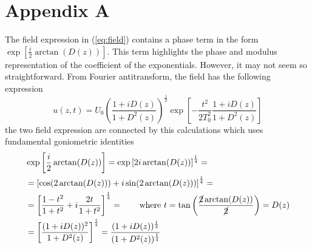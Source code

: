 \documentclass[10pt, lettersize, journal, onecolumn]{IEEEtran}
\begin{document}
\section*{Appendix A}
The field expression in (\ref{eq:field}) contains a phase term in the form $\exp\left[\frac{i}{2} \arctan(D(z)) \right]$. This term highlights the phase and modulus representation of the coefficient of the exponentials.
However, it may not seem so straightforward. From Fourier antitransform, the field has the following expression
\begin{equation}
	u(z, t) = U_0 \left(\dfrac{1+iD(z)}{1+D^2(z)}\right)^{\frac{1}{2}} \exp\left[-\dfrac{t^2}{2T_0^2} \dfrac{1+iD(z)}{1+D^2(z)}\right]
\end{equation}
the two field expression are connected by this calculations which uses fundamental goniometric identities
\begin{align}
	&  \exp\left[ \dfrac{i}{2} \arctan(D(z))\right] = \exp\left[ 2i \arctan(D(z))\right]^{\frac{1}{4}}=\\
	&  =\left[\cos(2\arctan(D(z))) + i \sin(2\arctan(D(z)))\right]^{\frac{1}{4}}=	\\
	&  =\left[\dfrac{1-t^2}{1+t^2} + i \dfrac{2t}{1+t^2}\right]^{\frac{1}{4}}  =  \qquad \text{where $t=\tan\left(\dfrac{\cancel{2}\arctan(D(z))}{\cancel{2}}\right) = D(z)$} \\
	& = \left[\dfrac{(1+iD(z))^2}{1+D^2(z)}\right]^{\frac{1}{4}} = \dfrac{(1+iD(z))^{\frac{1}{2}}}{(1+D^2(z))^{\frac{1}{4}}}
\end{align}
\end{document}
